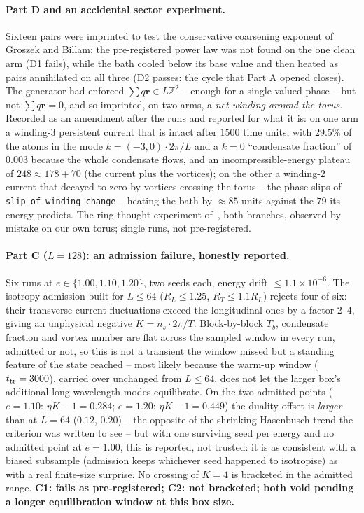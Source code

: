 \documentclass[11pt,a4paper]{article}
\newcommand{\lean}[1]{\texttt{\small #1}}
\begin{document}
\paragraph{Part D and an accidental sector experiment.} Sixteen pairs were imprinted to test the conservative
coarsening exponent of Groszek and Billam; the pre-registered power law was not found on the one clean arm (D1
fails), while the bath cooled below its base value and then heated as pairs annihilated on all three (D2 passes:
the cycle that Part A opened closes). The generator had enforced $\sum q\mathbf r\in L\mathbb Z^2$ -- enough for a
single-valued phase -- but not $\sum q\mathbf r=0$, and so imprinted, on two arms, a \emph{net winding around the
torus}. Recorded as an amendment after the runs and reported for what it is: on one arm a winding-$3$ persistent
current that is intact after $1500$ time units, with $29.5\%$ of the atoms in the mode $k=(-3,0)\cdot2\pi/L$ and a
$k=0$ ``condensate fraction'' of $0.003$ because the whole condensate flows, and an incompressible-energy plateau
of $248\approx178+70$ (the current plus the vortices); on the other a winding-$2$ current that decayed to zero by
vortices crossing the torus -- the phase slips of \lean{slip\_of\_winding\_change} -- heating the bath by
$\approx85$ units against the $79$ its energy predicts. The ring thought experiment of~\cite{Callens2026Causal},
both branches, observed by mistake on our own torus; single runs, not pre-registered.

\paragraph{Part C ($L=128$): an admission failure, honestly reported.} Six runs at $e\in\{1.00,1.10,1.20\}$,
two seeds each, energy drift $\le1.1\times10^{-6}$. The isotropy admission built for $L\le64$
($R_L\le1.25$, $R_T\le1.1R_L$) rejects four of six: their transverse current fluctuations exceed the
longitudinal ones by a factor $2$--$4$, giving an unphysical negative $K=n_s\cdot2\pi/T$. Block-by-block
$T_b$, condensate fraction and vortex number are flat across the sampled window in every run, admitted or
not, so this is not a transient the window missed but a standing feature of the state reached -- most likely
because the warm-up window ($t_{\rm tr}=3000$), carried over unchanged from $L\le64$, does not let the
larger box's additional long-wavelength modes equilibrate. On the two admitted points ($e=1.10$:
$\eta K-1=0.284$; $e=1.20$: $\eta K-1=0.449$) the duality offset is \emph{larger} than at $L=64$
($0.12$, $0.20$) -- the opposite of the shrinking Hasenbusch trend the criterion was written to see -- but
with one surviving seed per energy and no admitted point at $e=1.00$, this is reported, not trusted: it is as
consistent with a biased subsample (admission keeps whichever seed happened to isotropise) as with a real
finite-size surprise. No crossing of $K=4$ is bracketed in the admitted range. \textbf{C1: fails as
pre-registered; C2: not bracketed; both void pending a longer equilibration window at this box size.}
\end{document}

